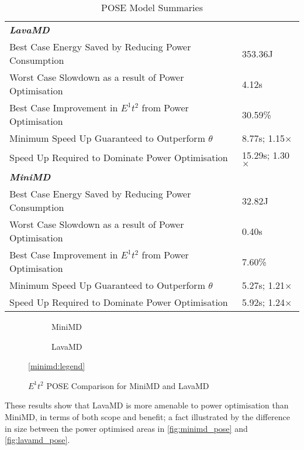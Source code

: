\begin{table}[h!]
\caption{POSE Model Summaries}
\label{tab:summaries}
\begin{tabular}{@{}ll@{}}\toprule
 \textbf{\emph{LavaMD}}&\\
 Best Case Energy Saved by Reducing Power Consumption & 353.36J \\
 Worst Case Slowdown as a result of Power Optimisation & 4.12s \\
 Best Case Improvement in $E^1t^2$ from Power Optimisation & 30.59\% \\
 Minimum Speed Up Guaranteed to Outperform $\theta$ & 8.77s; 1.15$\times$ \\
 Speed Up Required to Dominate Power Optimisation & 15.29s; 1.30$\times$ \\
 \rule{0pt}{2.5ex}\textbf{\textit{MiniMD}}& \\
 Best Case Energy Saved by Reducing Power Consumption & 32.82J \\
 Worst Case Slowdown as a result of Power Optimisation & 0.40s \\
 Best Case Improvement in $E^1t^2$ from Power Optimisation & 7.60\% \\
 Minimum Speed Up Guaranteed to Outperform $\theta$ & 5.27s; 1.21$\times$ \\
 Speed Up Required to Dominate Power Optimisation & 5.92s; 1.24$\times$ \\
\bottomrule
\end{tabular}
\end{table}

\begin{figure*}[t]%
  \scriptsize
  \begin{subfigure}[t]{.5\linewidth}%
    \caption{MiniMD}%
    \label{fig:minimd_pose}
  \end{subfigure}%
  \begin{subfigure}[t]{.5\linewidth}%
    \caption{LavaMD}%
    \label{fig:lavamd_pose}
  \end{subfigure}%
  \begin{center}%
    \ref{minimd:legend}%
  \end{center}%
  \caption{$E^1t^2$ POSE Comparison for MiniMD and LavaMD}%
  \label{fig:comparison}%
\end{figure*}

These results show that LavaMD is more amenable to power optimisation than MiniMD, in terms of both scope and benefit; a fact illustrated by the difference in size between the power optimised areas in \autoref{fig:minimd_pose} and \autoref{fig:lavamd_pose}.

